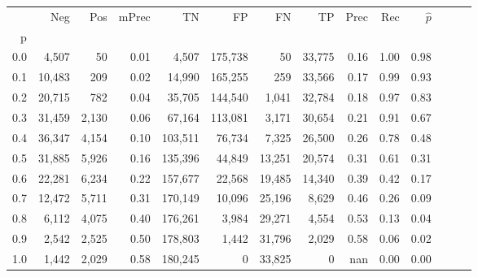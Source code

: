 \begin{tabular}{rrrrrrrrrrrrrr}
\toprule
{} &     Neg &    Pos & mPrec &       TN &       FP &      FN &      TP &  Prec &   Rec & $\hat{p}$ \\
p   &         &        &       &          &          &         &         &       &       &           \\
\midrule
0.0 &   4,507 &     50 &  0.01 &    4,507 &  175,738 &      50 &  33,775 &  0.16 &  1.00 &      0.98 \\
0.1 &  10,483 &    209 &  0.02 &   14,990 &  165,255 &     259 &  33,566 &  0.17 &  0.99 &      0.93 \\
0.2 &  20,715 &    782 &  0.04 &   35,705 &  144,540 &   1,041 &  32,784 &  0.18 &  0.97 &      0.83 \\
0.3 &  31,459 &  2,130 &  0.06 &   67,164 &  113,081 &   3,171 &  30,654 &  0.21 &  0.91 &      0.67 \\
0.4 &  36,347 &  4,154 &  0.10 &  103,511 &   76,734 &   7,325 &  26,500 &  0.26 &  0.78 &      0.48 \\
0.5 &  31,885 &  5,926 &  0.16 &  135,396 &   44,849 &  13,251 &  20,574 &  0.31 &  0.61 &      0.31 \\
0.6 &  22,281 &  6,234 &  0.22 &  157,677 &   22,568 &  19,485 &  14,340 &  0.39 &  0.42 &      0.17 \\
0.7 &  12,472 &  5,711 &  0.31 &  170,149 &   10,096 &  25,196 &   8,629 &  0.46 &  0.26 &      0.09 \\
0.8 &   6,112 &  4,075 &  0.40 &  176,261 &    3,984 &  29,271 &   4,554 &  0.53 &  0.13 &      0.04 \\
0.9 &   2,542 &  2,525 &  0.50 &  178,803 &    1,442 &  31,796 &   2,029 &  0.58 &  0.06 &      0.02 \\
1.0 &   1,442 &  2,029 &  0.58 &  180,245 &        0 &  33,825 &       0 &   nan &  0.00 &      0.00 \\
\bottomrule
\end{tabular}
